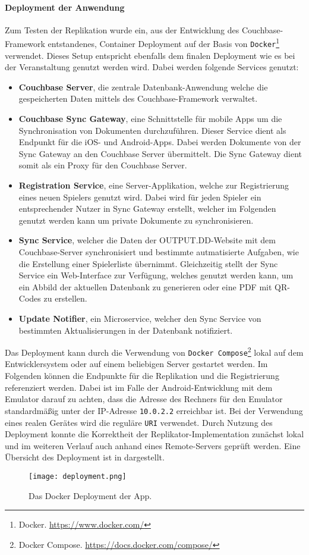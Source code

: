\newpage

\paragraph{Deployment der Anwendung} Zum Testen der Replikation wurde ein, aus der Entwicklung des Couchbase-Framework entstandenes, Container Deployment auf der Basis von \texttt{Docker}\footnote{Docker. \url{https://www.docker.com/}} verwendet. Dieses Setup entspricht ebenfalls dem finalen Deployment wie es bei der Veranstaltung genutzt werden wird. Dabei werden folgende Services genutzt: 

\begin{itemize}
    \item \textbf{Couchbase Server}, die zentrale Datenbank-Anwendung welche die gespeicherten Daten mittels des Couchbase-Framework verwaltet.
    \item \textbf{Couchbase Sync Gateway}, eine Schnittstelle für mobile Apps um die Synchronisation von Dokumenten durchzuführen. Dieser Service dient als Endpunkt für die iOS- und Android-Apps. Dabei werden Dokumente von der Sync Gateway an den Couchbase Server übermittelt. Die Sync Gateway dient somit als ein Proxy für den Couchbase Server.
    \item \textbf{Registration Service}, eine Server-Applikation, welche zur Registrierung eines neuen Spielers genutzt wird. Dabei wird für jeden Spieler ein entsprechender Nutzer in Sync Gateway erstellt, welcher im Folgenden genutzt werden kann um private Dokumente zu synchronisieren.
    \item \textbf{Sync Service}, welcher die Daten der OUTPUT.DD-Website mit dem Couchbase-Server synchronisiert und bestimmte autmatisierte Aufgaben, wie die Erstellung einer Spielerliste übernimmt. Gleichzeitig stellt der Sync Service ein Web-Interface zur Verfügung, welches genutzt werden kann, um ein Abbild der aktuellen Datenbank zu generieren oder eine PDF mit QR-Codes zu erstellen. 
    \item \textbf{Update Notifier}, ein Microservice, welcher den Sync Service von bestimmten Aktualisierungen in der Datenbank notifiziert.
\end{itemize}

Das Deployment kann durch die Verwendung von \texttt{Docker Compose}\footnote{Docker Compose. \url{https://docs.docker.com/compose/}} lokal auf dem Entwicklersystem oder auf einem beliebigen Server gestartet werden. Im Folgenden können die Endpunkte für die Replikation und die Registrierung referenziert werden. Dabei ist im Falle der Android-Entwicklung mit dem Emulator darauf zu achten, dass die Adresse des Rechners für den Emulator standardmäßig unter der IP-Adresse \texttt{10.0.2.2} erreichbar ist. Bei der Verwendung eines realen Gerätes wird die reguläre \texttt{URI} verwendet. Durch Nutzung des Deployment konnte die Korrektheit der Replikator-Implementation zunächst lokal und im weiteren Verlauf auch anhand eines Remote-Servers geprüft werden. Eine Übersicht des Deployment ist in  dargestellt.

\begin{figure}[H]
    \texttt{[image: deployment.png]}
    \caption{Das Docker Deployment der App.}\label{fig:deployment}
\end{figure}